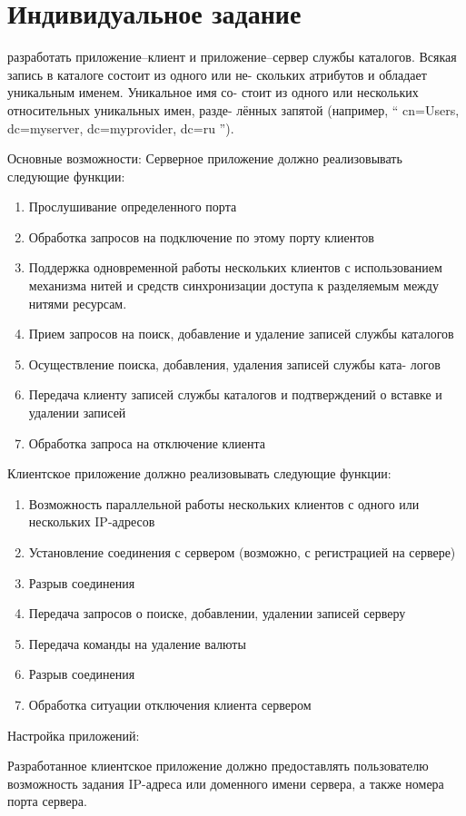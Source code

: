 \documentclass[a4paper,14pt]{article}
\begin{document}
\section{Индивидуальное задание}
разработать приложение–клиент и приложение–сервер службы каталогов. Всякая запись в каталоге состоит из одного или не- скольких атрибутов и обладает уникальным именем. Уникальное имя со- стоит из одного или нескольких относительных уникальных имен, разде- лённых запятой (например, “ cn=Users, dc=myserver, dc=myprovider, dc=ru ”).

Основные возможности:
Серверное приложение должно реализовывать следующие функции:
\begin{enumerate}
\item Прослушивание определенного порта
\item Обработка запросов на подключение по этому порту клиентов
\item Поддержка одновременной работы нескольких клиентов с использованием механизма нитей и средств синхронизации доступа к разделяемым между нитями ресурсам.
\item Прием запросов на поиск, добавление и удаление записей службы
каталогов
\item Осуществление поиска, добавления, удаления записей службы ката-
логов
\item Передача клиенту записей службы каталогов и подтверждений о вставке и удалении записей
\item Обработка запроса на отключение клиента
\end{enumerate}
Клиентское приложение должно реализовывать следующие функции:
	\begin{enumerate}
\item Возможность параллельной работы нескольких клиентов с одного или нескольких IP-адресов
\item Установление соединения с сервером (возможно, с регистрацией на сервере)
\item Разрыв соединения
\item Передача запросов о поиске, добавлении, удалении записей серверу
\item Передача команды на удаление валюты
\item Разрыв соединения
\item Обработка ситуации отключения клиента сервером
\end{enumerate}
Настройка приложений:

Разработанное клиентское приложение должно предоставлять пользователю возможность задания IP-адреса или доменного имени сервера, а также номера порта сервера.
\end{document}
